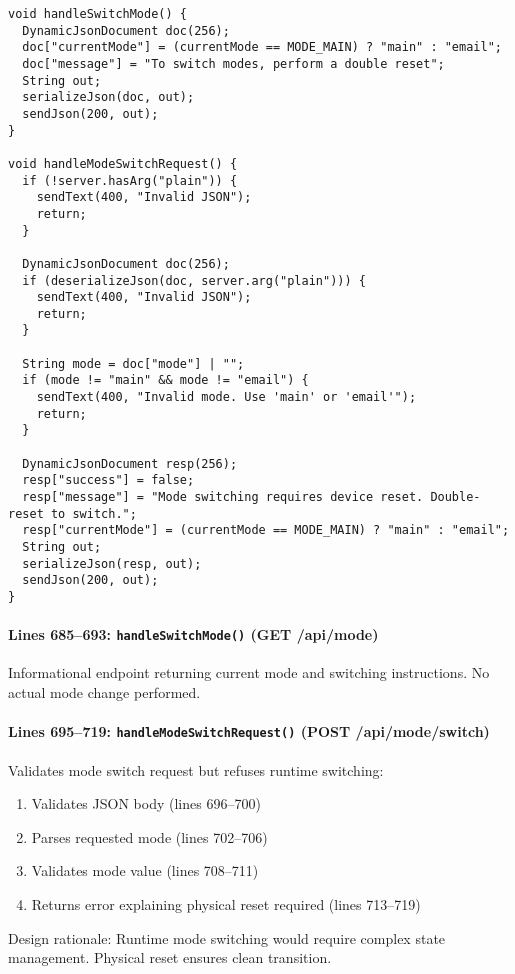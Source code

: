 \documentclass[11pt,a4paper]{article}
\begin{document}
\begin{verbatim}
void handleSwitchMode() {
  DynamicJsonDocument doc(256);
  doc["currentMode"] = (currentMode == MODE_MAIN) ? "main" : "email";
  doc["message"] = "To switch modes, perform a double reset";
  String out;
  serializeJson(doc, out);
  sendJson(200, out);
}

void handleModeSwitchRequest() {
  if (!server.hasArg("plain")) {
    sendText(400, "Invalid JSON");
    return;
  }
  
  DynamicJsonDocument doc(256);
  if (deserializeJson(doc, server.arg("plain"))) {
    sendText(400, "Invalid JSON");
    return;
  }
  
  String mode = doc["mode"] | "";
  if (mode != "main" && mode != "email") {
    sendText(400, "Invalid mode. Use 'main' or 'email'");
    return;
  }
  
  DynamicJsonDocument resp(256);
  resp["success"] = false;
  resp["message"] = "Mode switching requires device reset. Double-reset to switch.";
  resp["currentMode"] = (currentMode == MODE_MAIN) ? "main" : "email";
  String out;
  serializeJson(resp, out);
  sendJson(200, out);
}
\end{verbatim}

\paragraph{Lines 685--693: \texttt{handleSwitchMode()} (GET /api/mode)}
Informational endpoint returning current mode and switching instructions. No actual mode change performed.

\paragraph{Lines 695--719: \texttt{handleModeSwitchRequest()} (POST /api/mode/switch)}
Validates mode switch request but refuses runtime switching:
\begin{enumerate}[leftmargin=*]
  \item Validates JSON body (lines 696--700)
  \item Parses requested mode (lines 702--706)
  \item Validates mode value (lines 708--711)
  \item Returns error explaining physical reset required (lines 713--719)
\end{enumerate}

Design rationale: Runtime mode switching would require complex state management. Physical reset ensures clean transition.
\end{document}
